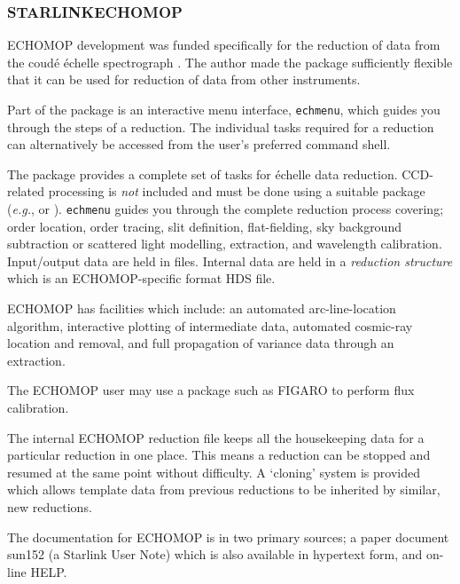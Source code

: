 \subsubsection{\label{se_echomop}STARLINK\sgspec{---}{ - }ECHOMOP}

ECHOMOP development was funded specifically for the reduction of data from
the  coud\'{e} \'{e}chelle spectrograph
\@.
The author made the package sufficiently flexible that it can be used for
reduction of data from other instruments.

Part of the package is an interactive menu interface, {\tt echmenu}, which
guides you through the steps of a reduction.  The individual tasks
required for a reduction can alternatively be accessed from the user's
preferred command shell.

The package provides a complete set of tasks for \'{e}chelle data
reduction.  CCD-related processing is {\em not} included and must be done
using a suitable package ({\em{e.g.}},  or
)\@.  {\tt echmenu} guides you
through the complete reduction process covering; order location,
order tracing, slit definition, flat-fielding, sky background subtraction or
scattered light modelling, extraction, and wavelength calibration.
Input/output data are held in  files.
Internal data are held in a {\em reduction structure} which is an
ECHOMOP-specific format HDS file.

ECHOMOP has facilities which include: an automated arc-line-location
algorithm, interactive plotting of intermediate data, automated cosmic-ray
location and removal, and full propagation of variance data through an
extraction.

The ECHOMOP user may use a package such as FIGARO to perform flux
calibration.

The internal ECHOMOP reduction file keeps all the housekeeping data for a
particular reduction in one place.  This means a reduction can be stopped
and resumed at the same point without difficulty.  A `cloning' system is
provided which allows template data from previous reductions to be
inherited by similar, new reductions.

The documentation for ECHOMOP is in two primary sources; a paper
document 
{sun152}{}
(a Starlink User Note) which is also available in hypertext form,
and on-line HELP\@.

